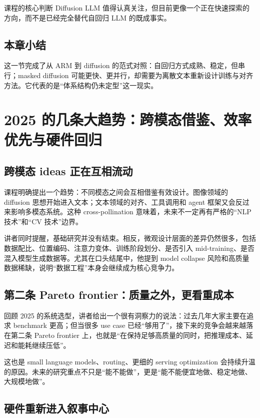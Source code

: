 \documentclass[a4paper]{article}
\begin{document}
\begin{importantbox}{课程的核心判断}
Diffusion LLM 值得认真关注，但目前更像一个正在快速探索的方向，而不是已经完全替代自回归 LLM 的既成事实。
\end{importantbox}

\subsection{本章小结}

这一节完成了从 ARM 到 diffusion 的范式对照：自回归方式成熟、稳定，但串行；masked diffusion 可能更快、更并行，却需要为离散文本重新设计训练与对齐方法。它代表的是“体系结构仍未定型”这一现实。

\section{2025 的几条大趋势：跨模态借鉴、效率优先与硬件回归}

\subsection{跨模态 ideas 正在互相流动}

课程明确提出一个趋势：不同模态之间会互相借鉴有效设计。图像领域的 diffusion 思想开始进入文本；文本领域的对齐、工具调用和 agent 框架又会反过来影响多模态系统。这种 cross-pollination 意味着，未来不一定再有严格的“NLP 技术”和“CV 技术”边界。

讲者同时提醒，基础研究并没有结束。相反，微观设计层面的差异仍然很多，包括数据配比、位置编码、注意力变体、训练阶段划分、是否引入 mid-training、是否混入模型生成数据等。尤其在口头结尾中，他提到 model collapse 风险和高质量数据稀缺，说明“数据工程”本身会继续成为核心竞争力。

\subsection{第二条 Pareto frontier：质量之外，更看重成本}

回顾 2025 的系统选型，讲者给出一个很有洞察力的说法：过去几年大家主要在追求 benchmark 更高；但当很多 use case 已经“够用了”，接下来的竞争会越来越落在第二条 Pareto frontier 上，也就是“在保持足够高质量的同时，把推理成本、延迟和能耗继续压低”。

这也是 small language models、routing、更细的 serving optimization 会持续升温的原因。未来的研究重点不只是“能不能做”，更是“能不能便宜地做、稳定地做、大规模地做”。

\subsection{硬件重新进入叙事中心}
\end{document}
